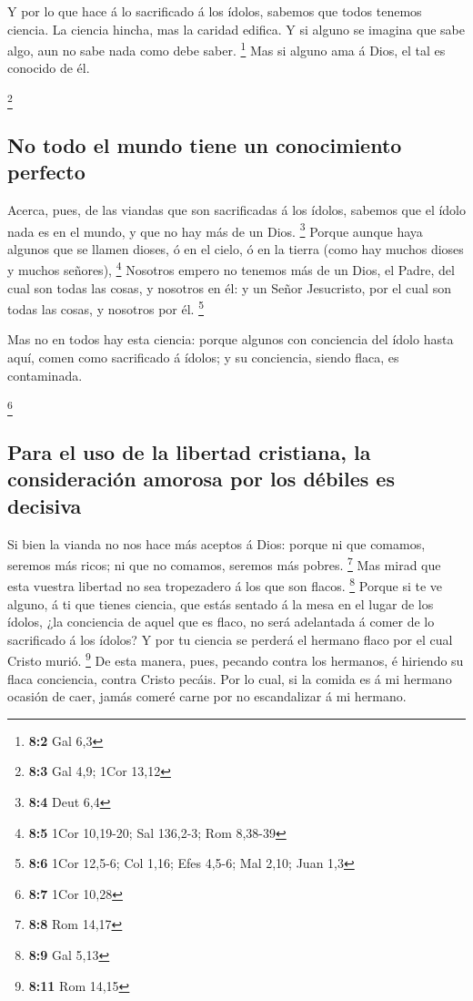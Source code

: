  Y por lo que hace á lo sacrificado á los ídolos, sabemos
que todos tenemos ciencia. La ciencia hincha, mas la caridad edifica.
 Y si alguno se imagina que sabe algo, aun no sabe nada como
debe saber. \footnote{\textbf{8:2} Gal 6,3}  Mas si alguno
ama á Dios, el tal es conocido de él.

\footnote{\textbf{8:3} Gal 4,9; 1Cor 13,12}

\hypertarget{no-todo-el-mundo-tiene-un-conocimiento-perfecto}{%
\subsection{No todo el mundo tiene un conocimiento
perfecto}\label{no-todo-el-mundo-tiene-un-conocimiento-perfecto}}

 Acerca, pues, de las viandas que son sacrificadas á los
ídolos, sabemos que el ídolo nada es en el mundo, y que no hay más de un
Dios. \footnote{\textbf{8:4} Deut 6,4}  Porque aunque haya
algunos que se llamen dioses, ó en el cielo, ó en la tierra (como hay
muchos dioses y muchos señores), \footnote{\textbf{8:5} 1Cor 10,19-20;
  Sal 136,2-3; Rom 8,38-39}  Nosotros empero no tenemos más
de un Dios, el Padre, del cual son todas las cosas, y nosotros en él: y
un Señor Jesucristo, por el cual son todas las cosas, y nosotros por él.
\footnote{\textbf{8:6} 1Cor 12,5-6; Col 1,16; Efes 4,5-6; Mal 2,10; Juan
  1,3}

 Mas no en todos hay esta ciencia: porque algunos con
conciencia del ídolo hasta aquí, comen como sacrificado á ídolos; y su
conciencia, siendo flaca, es contaminada.

\footnote{\textbf{8:7} 1Cor 10,28}

\hypertarget{para-el-uso-de-la-libertad-cristiana-la-consideraciuxf3n-amorosa-por-los-duxe9biles-es-decisiva}{%
\subsection{Para el uso de la libertad cristiana, la consideración
amorosa por los débiles es
decisiva}\label{para-el-uso-de-la-libertad-cristiana-la-consideraciuxf3n-amorosa-por-los-duxe9biles-es-decisiva}}

 Si bien la vianda no nos hace más aceptos á Dios: porque ni
que comamos, seremos más ricos; ni que no comamos, seremos más pobres.
\footnote{\textbf{8:8} Rom 14,17}  Mas mirad que esta
vuestra libertad no sea tropezadero á los que son flacos. \footnote{\textbf{8:9}
  Gal 5,13}  Porque si te ve alguno, á ti que tienes
ciencia, que estás sentado á la mesa en el lugar de los ídolos, ¿la
conciencia de aquel que es flaco, no será adelantada á comer de lo
sacrificado á los ídolos?  Y por tu ciencia se perderá el
hermano flaco por el cual Cristo murió. \footnote{\textbf{8:11} Rom
  14,15}  De esta manera, pues, pecando contra los
hermanos, é hiriendo su flaca conciencia, contra Cristo pecáis.
 Por lo cual, si la comida es á mi hermano ocasión de caer,
jamás comeré carne por no escandalizar á mi hermano.

